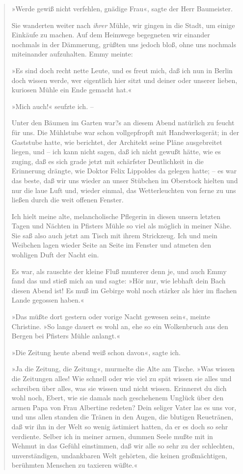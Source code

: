 \begin{verse}
»Werde gewiß nicht verfehlen, gnädige Frau«, sagte der Herr
Baumeister.

Sie wanderten weiter nach \emph{ihrer} Mühle, wir gingen in die
Stadt, um einige Einkäufe zu machen. Auf dem Heimwege begegneten
wir einander nochmals in der Dämmerung, grüßten uns jedoch bloß,
ohne uns nochmals miteinander aufzuhalten. Emmy meinte:

»Es sind doch recht nette Leute, und es freut mich, daß ich nun in
Berlin doch wissen werde, wer eigentlich hier sitzt und deiner oder
unserer lieben, kuriosen Mühle ein Ende gemacht hat.«

»Mich auch!« seufzte ich. –

Unter den Bäumen im Garten war?s an diesem Abend natürlich zu
feucht für uns. Die Mühlstube war schon vollgepfropft mit
Handwerksgerät; in der Gaststube hatte, wie berichtet, der
Architekt seine Pläne ausgebreitet liegen, und – ich kann nicht
sagen, daß ich nicht gewußt hätte, wie es zuging, daß es sich grade
jetzt mit schärfster Deutlichkeit in die Erinnerung drängte, wie
Doktor Felix Lippoldes da gelegen hatte; – es war das beste, daß
wir uns wieder an unser Stübchen im Oberstock hielten und nur die
laue Luft und, wieder einmal, das Wetterleuchten von ferne zu uns
ließen durch die weit offenen Fenster.

Ich hielt meine alte, melancholische Pflegerin in diesen unsern
letzten Tagen und Nächten in Pfisters Mühle so viel als möglich in
meiner Nähe. Sie saß also auch jetzt am Tisch mit ihrem Strickzeug.
Ich und mein Weibchen lagen wieder Seite an Seite im Fenster und
atmeten den wohligen Duft der Nacht ein.

Es war, als rauschte der kleine Fluß munterer denn je, und auch
Emmy fand das und stieß mich an und sagte: »Hör nur, wie lebhaft
dein Bach diesen Abend ist! Es muß im Gebirge wohl noch stärker als
hier im flachen Lande gegossen haben.«

»Das müßte dort gestern oder vorige Nacht gewesen sein«, meinte
Christine. »So lange dauert es wohl an, ehe so ein Wolkenbruch aus
den Bergen bei Pfisters Mühle anlangt.«

»Die Zeitung heute abend weiß schon davon«, sagte ich.

»Ja die Zeitung, die Zeitung«, murmelte die Alte am Tische. »Was
wissen die Zeitungen alles! Wie schnell oder wie viel zu spät
wissen sie alles und schreiben über alles, was sie wissen und nicht
wissen. Erinnerst du dich wohl noch, Ebert, wie sie damals nach
geschehenem Unglück über den armen Papa von Frau Albertine redeten?
Dein seliger Vater las es uns vor, und uns allen standen die Tränen
in den Augen, die blutigen Reuetränen, daß wir ihn in der Welt so
wenig ästimiert hatten, da er es doch so sehr verdiente. Selber ich
in meiner armen, dummen Seele mußte mit in Wehmut in das Gefühl
einstimmen, daß wir alle so sehr zu der schlechten, unverständigen,
undankbaren Welt gehörten, die keinen großmächtigen, berühmten
Menschen zu taxieren wüßte.«


\end{verse}
